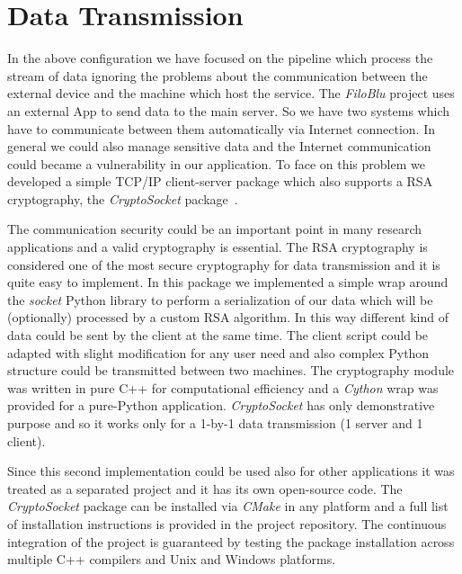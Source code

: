 \documentclass{standalone}
\begin{document}
\section*{Data Transmission}

In the above configuration we have focused on the pipeline which process the stream of data ignoring the problems about the communication between the external device and the machine which host the service.
The \emph{FiloBlu} project uses an external App to send data to the main server.
So we have two systems which have to communicate between them automatically via Internet connection.
In general we could also manage sensitive data and the Internet communication could became a vulnerability in our application.
To face on this problem we developed a simple TCP/IP client-server package which also supports a RSA cryptography, the \emph{CryptoSocket} package~\cite{CryptoSocket}.

The communication security could be an important point in many research applications and a valid cryptography is essential.
The RSA cryptography is considered one of the most secure cryptography for data transmission and it is quite easy to implement.
In this package we implemented a simple wrap around the \emph{socket} Python library to perform a serialization of our data which will be (optionally) processed by a custom RSA algorithm.
In this way different kind of data could be sent by the client at the same time.
The client script could be adapted with slight modification for any user need and also complex Python structure could be transmitted between two machines.
The cryptography module was written in pure C++ for computational efficiency and a \emph{Cython} wrap was provided for a pure-Python application.
\emph{CryptoSocket} has only demonstrative purpose and so it works only for a 1-by-1 data transmission (1 server and 1 client).

Since this second implementation could be used also for other applications it was treated as a separated project and it has its own open-source code.
The \emph{CryptoSocket} package can be installed via \emph{CMake} in any platform and a full list of installation instructions is provided in the project repository.
The continuous integration of the project is guaranteed by testing the package installation across multiple C++ compilers and Unix and Windows platforms.
\end{document}
